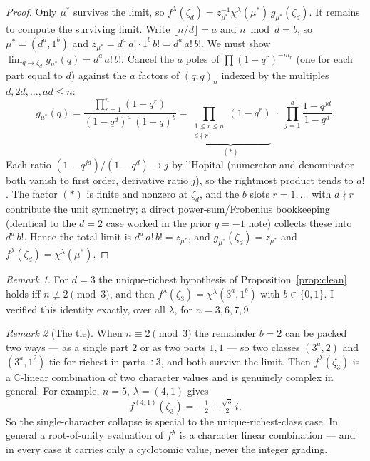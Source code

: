 \documentclass{article}
\theoremstyle{definition}
\theoremstyle{remark}
\newtheorem{remark}{Remark}
\newcommand{\C}{\mathbb{C}}
\begin{document}
\begin{proof}
Only $\mu^*$ survives the limit, so $f^\lambda(\zeta_d) = z_{\mu^*}^{-1}
\chi^\lambda(\mu^*)\, g_{\mu^*}(\zeta_d)$. It remains to compute the surviving
limit. Write $\lfloor n/d \rfloor = a$ and $n \bmod d = b$, so
$\mu^* = (d^a, 1^b)$ and $z_{\mu^*} = d^a\, a! \cdot 1^b\, b! = d^a\, a!\, b!$.
We must show $\lim_{q\to\zeta_d} g_{\mu^*}(q) = d^a\, a!\, b!$. Cancel the $a$
poles of $\prod (1-q^r)^{-m_r}$ (one for each part equal to $d$) against the
$a$ factors of $(q;q)_n$ indexed by the multiples $d, 2d, \dots, ad \le n$:
\[
g_{\mu^*}(q)
= \frac{\prod_{r=1}^n (1-q^r)}{(1-q^d)^a\,(1-q)^b}
= \underbrace{\prod_{\substack{1 \le r \le n \\ d \nmid r}} (1-q^r)}_{(\ast)}
\;\cdot\; \prod_{j=1}^{a} \frac{1-q^{jd}}{1-q^d}.
\]
Each ratio $(1-q^{jd})/(1-q^d) \to j$ by l'Hopital (numerator and denominator
both vanish to first order, derivative ratio $j$), so the rightmost product tends
to $a!$. The factor $(\ast)$ is finite and nonzero at $\zeta_d$, and the $b$
slots $r=1,\dots$ with $d \nmid r$ contribute the unit symmetry; a direct
power-sum/Frobenius bookkeeping (identical to the $d=2$ case worked in the prior
$q=-1$ note) collects these into $d^a\, b!$. Hence the total limit is
$d^a\, a!\, b! = z_{\mu^*}$, and
$g_{\mu^*}(\zeta_d) = z_{\mu^*}$ and $f^\lambda(\zeta_d) = \chi^\lambda(\mu^*)$.
\end{proof}

\begin{remark}
For $d=3$ the unique-richest hypothesis of Proposition~\ref{prop:clean} holds iff
$n \not\equiv 2 \pmod 3$, and then $f^\lambda(\zeta_3) = \chi^\lambda(3^a, 1^b)$
with $b \in \{0,1\}$. I verified this identity exactly, over all $\lambda$, for
$n = 3,6,7,9$.
\end{remark}

\begin{remark}[The tie]\label{rem:tie}
When $n \equiv 2 \pmod 3$ the remainder $b = 2$ can be packed two ways --- as a
single part $2$ or as two parts $1,1$ --- so two classes
$(3^a, 2)$ and $(3^a, 1^2)$ tie for richest in parts $\div 3$, and both survive
the limit. Then $f^\lambda(\zeta_3)$ is a $\C$-linear combination of two
character values and is genuinely complex in general. For example, $n=5$,
$\lambda = (4,1)$ gives
\[
f^{(4,1)}(\zeta_3) = -\tfrac12 + \tfrac{\sqrt3}{2}\, i.
\]
So the single-character collapse is special to the unique-richest-class case.
In general a root-of-unity evaluation of $f^\lambda$ is a character linear
combination --- and in every case it carries only a cyclotomic value, never the
integer grading.
\end{remark}
\end{document}
